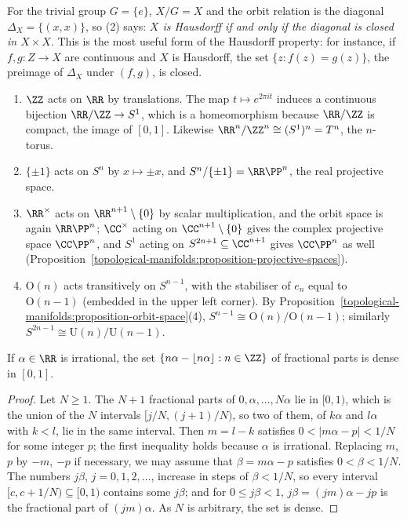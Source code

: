 For the trivial group $G = \{e\}$, $X/G = X$ and the orbit relation is the diagonal $\Delta_X = \{(x, x)\}$, so (2) says: \emph{$X$ is Hausdorff if and only if the diagonal is closed in
$X \times X$}. This is the most useful form of the Hausdorff property: for instance, if $f, g \colon Z \to X$ are continuous and $X$ is Hausdorff, the set $\{z : f(z) = g(z)\}$, the preimage of
$\Delta_X$ under $(f, g)$, is closed.

\begin{example}\label{topological-manifolds:example-orbit-spaces}
\begin{enumerate}
\item $\ZZ$ acts on $\RR$ by translations. The map $t \mapsto e^{2\pi it}$ induces a continuous bijection $\RR/\ZZ \to S^1$, which is a homeomorphism because $\RR/\ZZ$ is compact, the image of $[0, 1]$. Likewise
$\RR^n/\ZZ^n \cong (S^1)^n = T^n$, the $n$-torus.
\item $\{\pm1\}$ acts on $S^n$ by $x \mapsto \pm x$, and $S^n/\{\pm1\} = \RR\PP^n$, the real projective space.
\item $\RR^\times$ acts on $\RR^{n+1} \setminus \{0\}$ by scalar multiplication, and the orbit space is again $\RR\PP^n$; $\CC^\times$ acting on $\CC^{n+1} \setminus \{0\}$ gives the complex projective space $\CC\PP^n$, and $S^1$
acting on $S^{2n+1} \subseteq \CC^{n+1}$ gives $\CC\PP^n$ as well (Proposition~\ref{topological-manifolds:proposition-projective-spaces}).
\item $\mathrm{O}(n)$ acts transitively on $S^{n-1}$, with the stabiliser of $e_n$ equal to $\mathrm{O}(n - 1)$ (embedded in the upper left corner). By Proposition~\ref{topological-manifolds:proposition-orbit-space}(4),
$S^{n-1} \cong \mathrm{O}(n)/\mathrm{O}(n - 1)$; similarly $S^{2n-1} \cong \mathrm{U}(n)/\mathrm{U}(n - 1)$.
\end{enumerate}
\end{example}

\begin{lemma}[Kronecker]\label{topological-manifolds:lemma-kronecker}
If $\alpha \in \RR$ is irrational, the set $\{n\alpha - \lfloor n\alpha\rfloor : n \in \ZZ\}$ of fractional parts is dense in $[0, 1]$.
\end{lemma}

\begin{proof}
Let $N \geq 1$. The $N + 1$ fractional parts of $0, \alpha, \ldots, N\alpha$ lie in $[0, 1)$, which is the union of the $N$ intervals $[j/N, (j+1)/N)$, so two of them, of $k\alpha$ and $l\alpha$ with $k < l$, lie in the same
interval. Then $m = l - k$ satisfies $0 < |m\alpha - p| < 1/N$ for some integer $p$; the first inequality holds because $\alpha$ is irrational. Replacing $m$, $p$ by $-m$, $-p$ if necessary, we may assume that
$\beta = m\alpha - p$ satisfies $0 < \beta < 1/N$. The numbers $j\beta$, $j = 0, 1, 2, \ldots$, increase in steps of $\beta < 1/N$, so every interval $[c, c + 1/N) \subseteq [0, 1)$ contains some $j\beta$; and for $0 \leq j\beta < 1$,
$j\beta = (jm)\alpha - jp$ is the fractional part of $(jm)\alpha$. As $N$ is arbitrary, the set is dense.
\end{proof}

